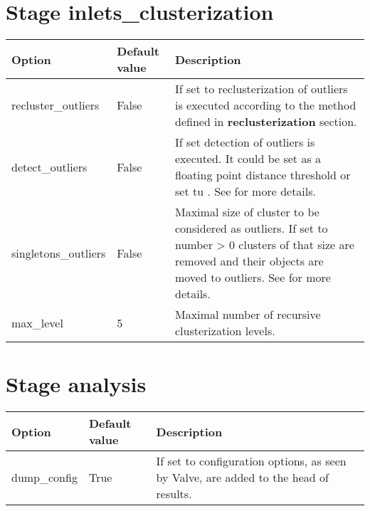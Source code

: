 \documentclass[a4paper,10pt,english]{sphinxmanual}
\begin{document}
\section{Stage \textbf{inlets\_clusterization}}
\label{valve/valve_config:stage-inlets-clusterization}
\noindent\begin{tabulary}{\linewidth}{|L|L|L|}
\hline
\textsf{\relax 
Option
\unskip}\relax &\textsf{\relax 
Default value
\unskip}\relax &\textsf{\relax 
Description
\unskip}\relax \\
\hline
recluster\_outliers
&
False
&
If set to  reclusterization of outliers is executed
according to the method defined in \textbf{reclusterization} section.
\\
\hline
detect\_outliers
&
False
&
If set detection of outliers is executed. It could be set as a
floating point distance threshold or set tu . See
{\hyperref[valve/valve_manual:clusterization\string-of\string-inlets]{}} for more details.
\\
\hline
singletons\_outliers
&
False
&
Maximal size of cluster to be considered as outliers. If set to
number \textgreater{} 0 clusters of that size are removed and their objects
are moved to outliers. See {\hyperref[valve/valve_manual:clusterization\string-of\string-inlets]{}} for
more details.
\\
\hline
max\_level
&
5
&
Maximal number of recursive clusterization levels.
\\
\hline\end{tabulary}



\section{Stage \textbf{analysis}}
\label{valve/valve_config:stage-analysis}
\noindent\begin{tabulary}{\linewidth}{|L|L|L|}
\hline
\textsf{\relax 
Option
\unskip}\relax &\textsf{\relax 
Default value
\unskip}\relax &\textsf{\relax 
Description
\unskip}\relax \\
\hline
dump\_config
&
True
&
If set to  configuration options, as seen by Valve, are
added to the head of results.
\\
\hline\end{tabulary}
\end{document}
